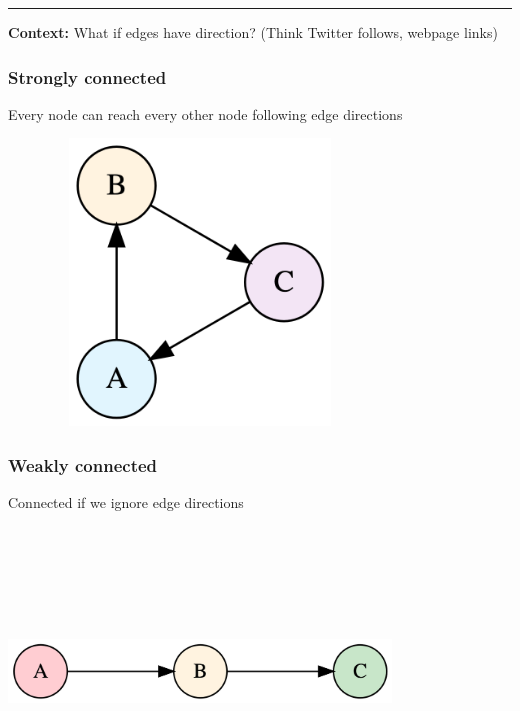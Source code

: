 \documentclass[
  letterpaper,
  DIV=11,
  numbers=noendperiod,
  oneside]{scrartcl}
\begin{document}
\begin{center}\rule{0.5\linewidth}{0.5pt}\end{center}

\textbf{Context:} What if edges have direction? (Think Twitter follows,
webpage links)

\subsubsection{Strongly connected 💪}\label{strongly-connected}

Every node can reach every other node following edge directions

\includegraphics[width=4in,height=3in]{slide01_files/figure-latex/dot-figure-3.png}

\subsubsection{Weakly connected 🤝}\label{weakly-connected}

Connected if we ignore edge directions

\includegraphics[width=4in,height=3in]{slide01_files/figure-latex/dot-figure-2.png}
\end{document}
